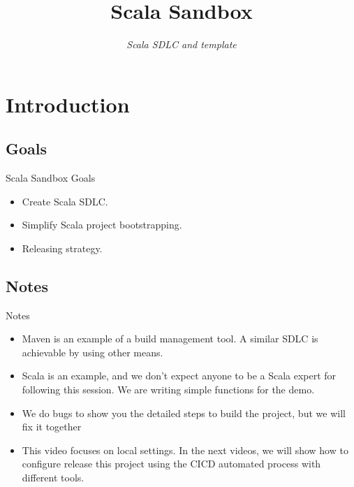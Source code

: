 \documentclass[aspectratio=169]{beamer}
\title[Scala Sandbox]{Scala Sandbox}
\subtitle{\textit{Scala SDLC and template}}
\begin{document}
    \maketitle



    \section{Introduction}\label{sec:introduction}

    \subsection{Goals}\label{subsec:goals}
    \begin{frame}{Scala Sandbox Goals}
        \begin{itemize}[<+- | alert@+>]
            \item Create Scala SDLC.
            \item Simplify Scala project bootstrapping.
            \item Releasing strategy.
        \end{itemize}
    \end{frame}

    \subsection{Notes}\label{subsec:notes}
    \begin{frame}{Notes}
        \begin{itemize}[<+- | alert@+>]
            \item Maven is an example of a build management tool.
            A similar SDLC is achievable by using other means.
            \item Scala is an example, and we don't expect anyone to be a Scala expert for following this session.
            We are writing simple functions for the demo.
            \item We do bugs to show you the detailed steps to build the project, but we will fix it together
            \item This video focuses on local settings.
            In the next videos, we will show how to configure release this project using the CICD automated process with different tools.
        \end{itemize}
    \end{frame}
\end{document}
